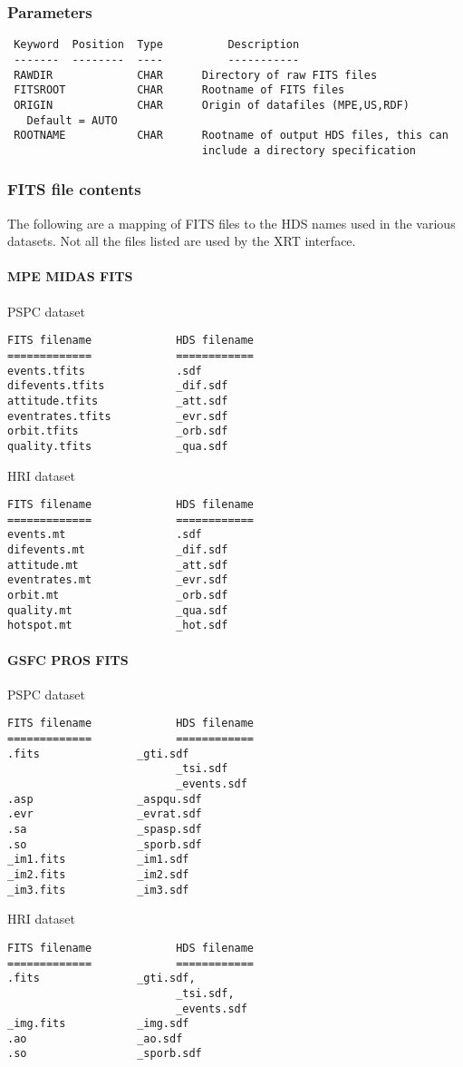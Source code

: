 \documentclass{book}
\renewcommand{\_}{{\tt\char'137}}     %
\begin{document}
\subsubsection{Parameters}
\begin{verbatim}
 Keyword  Position  Type          Description
 -------  --------  ----          -----------
 RAWDIR             CHAR      Directory of raw FITS files
 FITSROOT           CHAR      Rootname of FITS files
 ORIGIN             CHAR      Origin of datafiles (MPE,US,RDF)
   Default = AUTO
 ROOTNAME           CHAR      Rootname of output HDS files, this can
                              include a directory specification

\end{verbatim}\subsubsection{FITS file contents}
The following are a mapping of FITS files to the HDS names used in
the various datasets. Not all the files listed are used by the XRT
interface.

\paragraph{MPE MIDAS FITS}
PSPC dataset
\begin{verbatim}
FITS filename             HDS filename
=============             ============
events.tfits              .sdf
difevents.tfits           _dif.sdf
attitude.tfits            _att.sdf
eventrates.tfits          _evr.sdf
orbit.tfits               _orb.sdf
quality.tfits             _qua.sdf
\end{verbatim}
HRI dataset
\begin{verbatim}
FITS filename             HDS filename
=============             ============
events.mt                 .sdf
difevents.mt              _dif.sdf
attitude.mt               _att.sdf
eventrates.mt             _evr.sdf
orbit.mt                  _orb.sdf
quality.mt                _qua.sdf
hotspot.mt                _hot.sdf
\end{verbatim}
\paragraph{GSFC PROS FITS}
PSPC dataset
\begin{verbatim}
FITS filename             HDS filename
=============             ============
.fits               _gti.sdf
                          _tsi.sdf
                          _events.sdf
.asp                _aspqu.sdf
.evr                _evrat.sdf
.sa                 _spasp.sdf
.so                 _sporb.sdf
_im1.fits           _im1.sdf
_im2.fits           _im2.sdf
_im3.fits           _im3.sdf
\end{verbatim}
HRI dataset
\begin{verbatim}
FITS filename             HDS filename
=============             ============
.fits               _gti.sdf,
                          _tsi.sdf,
                          _events.sdf
_img.fits           _img.sdf
.ao                 _ao.sdf
.so                 _sporb.sdf
\end{verbatim}
\end{document}
